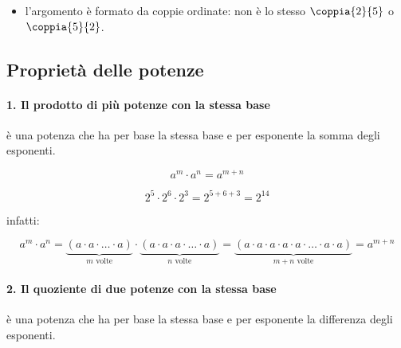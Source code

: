 \vspace{-1em}
\begin{osservazione}
\begin{itemize} [nosep]
\item l'argomento è formato da coppie ordinate: non è lo stesso 
\(\coppia{2}{5}\) o \(\coppia{5}{2}\).
\end{itemize}

\end{osservazione}

\subsection{Proprietà delle potenze}

\paragraph{1. Il prodotto di più potenze con la stessa base} 
è una potenza che ha per base la stessa base e per esponente la somma degli 
esponenti.

\begin{minipage}[c]{.35\textwidth}
\vspace{4.5mm}
 \[\boxed{a^m \cdot a^n = a^{m+n}}\]
\end{minipage}
\hfil
\begin{minipage}[c]{.35\textwidth}
\[ 2^5 \cdot 2^6 \cdot 2^3 = 2^{5+6+3}=2^{14}\]
\end{minipage}
\hfil
\begin{minipage}[c]{.25\textwidth}
\vspace{4.5mm}
\centering infatti:
\end{minipage}
\[ a^m \cdot a^n = \underbrace{(a\cdot a\cdot\ldots\cdot a)}_{m\text{ 
volte}}\cdot%
 \underbrace{(a\cdot a\cdot a\cdot\ldots\cdot a)}_{n\text{ volte}}
 =\underbrace{(a\cdot a\cdot a\cdot a\cdot a\cdot\ldots\cdot a\cdot 
a)}_{m+n\text{ volte}}%
 =a^{m+n}\]
\vspace{-1em}
\paragraph{2. Il quoziente di due potenze con la stessa base} 
è una potenza che ha per base la stessa base e per esponente la differenza 
degli esponenti.

